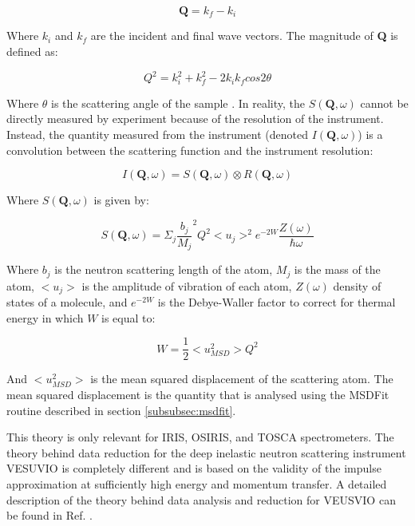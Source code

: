 \documentclass[paper=a4, fontsize=11pt]{scrartcl}	%
\numberwithin{equation}{section}															%
\numberwithin{figure}{section}																%
\numberwithin{table}{section}																%
\begin{document}
\begin{equation}
\mathbf{Q} = k_f - k_i
\end{equation}

Where $k_i$ and $k_f$ are the incident and final wave vectors. The magnitude of \textbf{Q} is defined as:

\begin{equation}
Q^2 = k_i^2 + k_f^2 - 2k_ik_fcos 2\theta
\end{equation}

Where $\theta$ is the scattering angle of the sample \citep{dssivia2011}. In reality, the $S(\mathbf{Q}, \omega)$ cannot be directly measured by experiment because of the resolution of the instrument. Instead, the quantity measured from the instrument (denoted $I(\mathbf{Q}, \omega)$) is a convolution between the scattering function and the instrument resolution:

\begin{equation}
\label{eq:instrument-result}
I(\mathbf{Q}, \omega) = S(\mathbf{Q}, \omega) \otimes R(\mathbf{Q}, \omega)
\end{equation}

Where $S(\mathbf{Q}, \omega)$ is given by:

\begin{equation}
S(\mathbf{Q}, \omega) = \Sigma_j \frac{b_j}{M_j}^2Q^2 < u_j >^2 e^{-2W}\frac{Z(\omega)}{\hbar\omega}
\end{equation}

Where $b_j$ is the neutron scattering length of the atom, $M_j$ is the mass of the atom, $< u_j >$ is the amplitude of vibration of each atom,  $Z(\omega)$ density of states of a molecule, and $e^{-2W}$ is the Debye-Waller factor \cite{smukhopadhyay2014} to correct for thermal energy in which $W$ is equal to:

\begin{equation}
W = \frac{1}{2} < u^2_{MSD} > Q^2
\end{equation}

And $< u^2_{MSD} >$ is the mean squared displacement of the scattering atom. The mean squared displacement is the quantity that is analysed using the MSDFit routine described in section \ref{subsubsec:msdfit}.

This theory is only relevant for IRIS, OSIRIS, and TOSCA spectrometers. The theory behind data reduction for the deep inelastic neutron scattering instrument VESUVIO is completely different and is based on the validity of the impulse approximation at sufficiently high energy and momentum transfer. A detailed description of the theory behind data analysis and reduction for VEUSVIO can be found in Ref. \cite{mayers2012vesuvio}.
\end{document}

